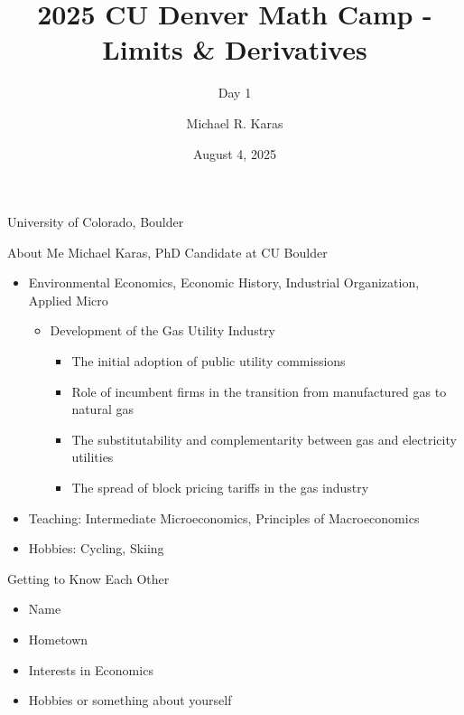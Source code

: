 \documentclass[aspectratio=169]{beamer}
\title{2025 CU Denver Math Camp - Limits \& Derivatives}
\subtitle{Day 1}
\date{August 4, 2025}
\author{Michael R. Karas}
\begin{document}
\begin{frame}
\maketitle

{\footnotesize University of Colorado, Boulder}
\end{frame}

\begin{frame}{About Me}\label{main1}
Michael Karas, PhD Candidate at CU Boulder
\begin{itemize}
	\begin{itemize}
		\item michael.karas@colorado.edu
		\item Entering my 5th year, will be on job market Fall 2025
	\end{itemize}
	\item Environmental Economics, Economic History, Industrial Organization, Applied Micro
	\begin{itemize}
		\item Development of the Gas Utility Industry
			\begin{itemize}
				\item The initial adoption of public utility commissions
				\item Role of incumbent firms in the transition from manufactured gas to natural gas
				\item The substitutability and complementarity between gas and electricity utilities
				\item The spread of block pricing tariffs in the gas industry
			\end{itemize}
	\end{itemize}
	\item Teaching: Intermediate Microeconomics, Principles of Macroeconomics
	\item Hobbies: Cycling, Skiing
\end{itemize}

\end{frame}


\begin{frame}{Getting to Know Each Other}\label{main1}
\begin{itemize}
	\item{Name}
	\item{Hometown}
	\item{Interests in Economics}
	\item{Hobbies or something about yourself}
\end{itemize}

\end{frame}
\end{document}
